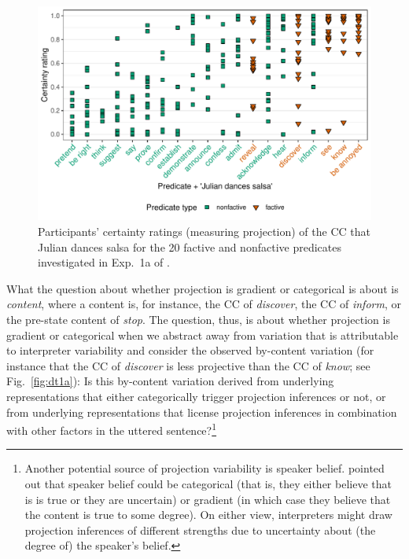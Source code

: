 \documentclass[11pt,fleqn]{article}
\newcommand{\6}{\mbox{$[\hspace*{-.6mm}[$}}
\newcommand{\9}{\mbox{$]\hspace*{-.6mm}]$}}
\begin{document}
\begin{figure}[h!]
\centering
\includegraphics[width=.8\textwidth]{../../results/main/13explicitIgnorance/graphs/mean-certainty-by-predicateType-JULIAN}
\caption{Participants' certainty ratings (measuring projection) of the CC that Julian dances salsa for the 20 \color{orange}factive \color{black} and \color{green}nonfactive \color{black} predicates investigated in Exp.~1a of \citealt{degen-tonhauser-language}.}\label{fig:dt1a-JULIAN}
\end{figure}

What the question about whether projection is gradient or categorical is about is {\em content}, where a content is, for instance, the CC of {\em discover}, the CC of {\em inform}, or the pre-state content of {\em stop}. The question, thus, is about whether projection is gradient or categorical when we abstract away from variation that is attributable to interpreter variability and consider the observed by-content variation (for instance that the CC of {\em discover} is less projective than the CC of {\em know}; see Fig.~\ref{fig:dt1a}): Is this by-content variation derived from underlying representations that either categorically trigger projection inferences or not, or from underlying representations that license projection inferences in combination with other factors in the uttered sentence?\footnote{Another potential source of projection variability is speaker belief. \citealt[498f.]{tbd-variability} pointed out that speaker belief could be categorical (that is, they either believe that is is true or they are uncertain) or gradient (in which case they believe that the content is true to some degree). On either view, interpreters might draw projection inferences of different strengths due to uncertainty about (the degree of) the speaker's belief.} 
\end{document}
